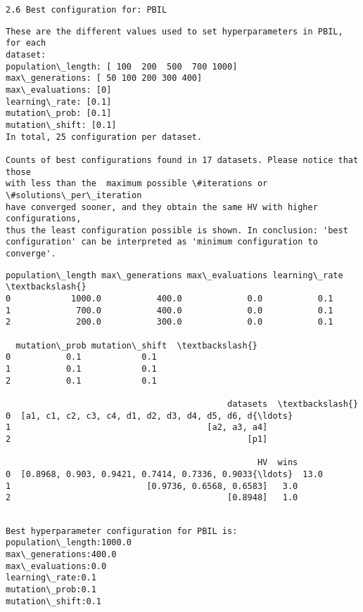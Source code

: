 \documentclass[11pt]{article}
\begin{document}
    \begin{verbatim}
2.6 Best configuration for: PBIL
\end{verbatim}

    \begin{Verbatim}[commandchars=\\\{\}]
These are the different values used to set hyperparameters in PBIL, for each
dataset:
population\_length: [ 100  200  500  700 1000]
max\_generations: [ 50 100 200 300 400]
max\_evaluations: [0]
learning\_rate: [0.1]
mutation\_prob: [0.1]
mutation\_shift: [0.1]
In total, 25 configuration per dataset.

Counts of best configurations found in 17 datasets. Please notice that those
with less than the  maximum possible \#iterations or \#solutions\_per\_iteration
have converged sooner, and they obtain the same HV with higher configurations,
thus the least configuration possible is shown. In conclusion: 'best
configuration' can be interpreted as 'minimum configuration to converge'.
    \end{Verbatim}

    
    \begin{Verbatim}[commandchars=\\\{\}]
  population\_length max\_generations max\_evaluations learning\_rate  \textbackslash{}
0            1000.0           400.0             0.0           0.1   
1             700.0           400.0             0.0           0.1   
2             200.0           300.0             0.0           0.1   

  mutation\_prob mutation\_shift  \textbackslash{}
0           0.1            0.1   
1           0.1            0.1   
2           0.1            0.1   

                                            datasets  \textbackslash{}
0  [a1, c1, c2, c3, c4, d1, d2, d3, d4, d5, d6, d{\ldots}   
1                                       [a2, a3, a4]   
2                                               [p1]   

                                                  HV  wins  
0  [0.8968, 0.903, 0.9421, 0.7414, 0.7336, 0.9033{\ldots}  13.0  
1                           [0.9736, 0.6568, 0.6583]   3.0  
2                                           [0.8948]   1.0  
    \end{Verbatim}

    
    \begin{Verbatim}[commandchars=\\\{\}]

Best hyperparameter configuration for PBIL is:
population\_length:1000.0
max\_generations:400.0
max\_evaluations:0.0
learning\_rate:0.1
mutation\_prob:0.1
mutation\_shift:0.1
    \end{Verbatim}
\end{document}

